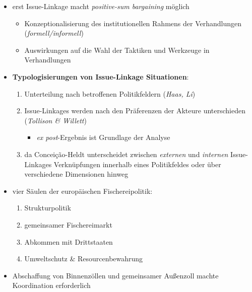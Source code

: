 \documentclass[11pt,a4paper,ngerman]{report}
\begin{document}
		\begin{itemize}
		 \item{erst Issue-Linkage macht \textit{positive-sum bargaining} m\"{o}glich}

		    \begin{itemize}
		     \item{Konzeptionalisierung des institutionellen Rahmens der Verhandlungen (\textsl{formell/informell})}
		     \item{Auswirkungen auf die Wahl der Taktiken und Werkzeuge in Verhandlungen}
		    \end{itemize}

		   \item{\textbf{Typologisierungen von Issue-Linkage \textendash {} Situationen$\colon$}}

		    \begin{enumerate}
		      \item{Unterteilung nach betroffenen Politikfeldern (\textsl{Haas, Li})} 
		      \item{Issue-Linkages werden nach den Pr\"{a}ferenzen der Akteure unterschieden (\textsl{Tollison \& Willett})} 

			\begin{itemize}
			 \item{\textsl{ex post}-Ergebnis ist Grundlage der Analyse}
			\end{itemize}

		      \item{da Concei\c{c}\~{a}o-Heldt unterscheidet zwischen \textsl{externen} und \textsl{internen} Issue-Linkages \textendash {} Verkn\"{u}pfungen innerhalb eines Politikfeldes oder \"{u}ber verschiedene Dimensionen hinweg}

		    \end{enumerate}

		  \item{vier S\"{a}ulen der europ\"{a}ischen Fischereipolitik$\colon$}

		    \begin{enumerate}
		     \item{Strukturpolitik} 
		     \item{gemeinsamer Fischereimarkt}
		     \item{Abkommen mit Drittstaaten}
		     \item{Umweltschutz \& Resourcenbewahrung}
		    \end{enumerate}


		  \item{Abschaffung von Binnenz\"{o}llen und gemeinsamer Au\ss{}enzoll machte Koordination erforderlich}


\end{itemize}
\end{document}
